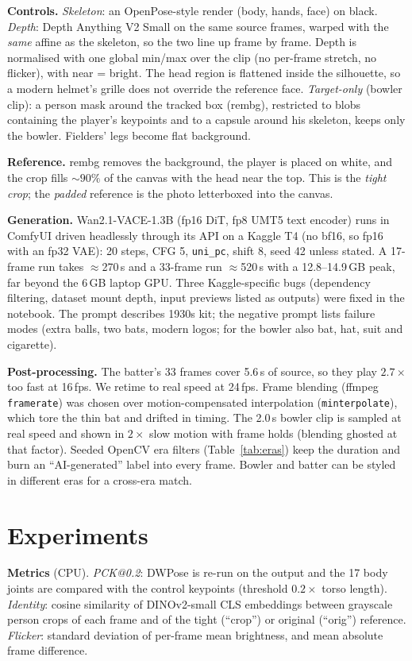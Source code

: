 \documentclass[10pt,twocolumn]{article}
\begin{document}
\textbf{Controls.} \emph{Skeleton}: an OpenPose-style render (body, hands, face) on black. \emph{Depth}: Depth Anything
V2 Small on the same source frames, warped with the \emph{same} affine as the skeleton, so the two line up frame by frame.
Depth is normalised with one global min/max over the clip (no per-frame stretch, no flicker), with near = bright. The head
region is flattened inside the silhouette, so a modern helmet's grille does not override the reference face.
\emph{Target-only} (bowler clip): a person mask around the tracked box (rembg), restricted to blobs containing the
player's keypoints and to a capsule around his skeleton, keeps only the bowler. Fielders' legs become flat background.

\textbf{Reference.} rembg removes the background, the player is placed on white, and the crop fills ${\sim}90\%$ of the
canvas with the head near the top. This is the \emph{tight crop}; the \emph{padded} reference is the photo letterboxed
into the canvas.

\textbf{Generation.} Wan2.1-VACE-1.3B (fp16 DiT, fp8 UMT5 text encoder) runs in ComfyUI driven headlessly through its
API on a Kaggle T4 (no bf16, so fp16 with an fp32 VAE): 20 steps, CFG 5, \texttt{uni\_pc}, shift 8, seed 42 unless
stated. A 17-frame run takes ${\approx}$270\,s and a 33-frame run ${\approx}$520\,s with a 12.8--14.9\,GB peak, far
beyond the 6\,GB laptop GPU. Three Kaggle-specific bugs (dependency filtering, dataset mount depth,
input previews listed as outputs) were fixed in the notebook. The prompt describes 1930s kit; the negative prompt lists
failure modes (extra balls, two bats, modern logos; for the bowler also bat, hat, suit and cigarette).

\textbf{Post-processing.} The batter's 33 frames cover 5.6\,s of source, so they play $2.7{\times}$ too fast at 16\,fps.
We retime to real speed at 24\,fps. Frame blending (ffmpeg \texttt{framerate}) was chosen over motion-compensated
interpolation (\texttt{minterpolate}), which tore the thin bat and drifted in timing. The 2.0\,s bowler clip is sampled at
real speed and shown in $2{\times}$ slow motion with frame holds (blending ghosted at that factor). Seeded OpenCV era
filters (Table~\ref{tab:eras}) keep the duration and burn an ``AI-generated'' label into every frame. Bowler and batter
can be styled in different eras for a cross-era match.

\section{Experiments}
\textbf{Metrics} (CPU). \emph{PCK@0.2}: DWPose is re-run on the output and the 17 body joints are compared with the
control keypoints (threshold $0.2\times$ torso length). \emph{Identity}: cosine similarity of DINOv2-small CLS embeddings
between grayscale person crops of each frame and of the tight (``crop'') or original (``orig'') reference.
\emph{Flicker}: standard deviation of per-frame mean brightness, and mean absolute frame difference.
\end{document}
